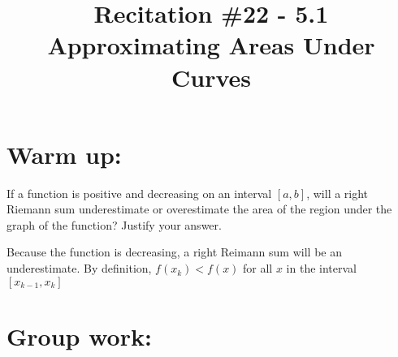 \documentclass[handout,nooutcomes]{ximera}
\title{Recitation \#22 - 5.1 Approximating Areas Under Curves}
\begin{document}
\begin{abstract}		\end{abstract}
\maketitle

\section*{Warm up:} 
If a function is positive and decreasing on an interval $[a,b]$, will a right Riemann sum underestimate or overestimate the area of the region under the graph of the function? Justify your answer.
		\begin{freeResponse}
		Because the function is decreasing, a right Reimann sum will be an underestimate.  By definition, $f(x_k)< f(x)$ for all $x$ in the interval $[x_{k-1},x_k]$ 
		\end{freeResponse}	
		
		
		

	
	
	
	
	

\section*{Group work:}
\end{document}
